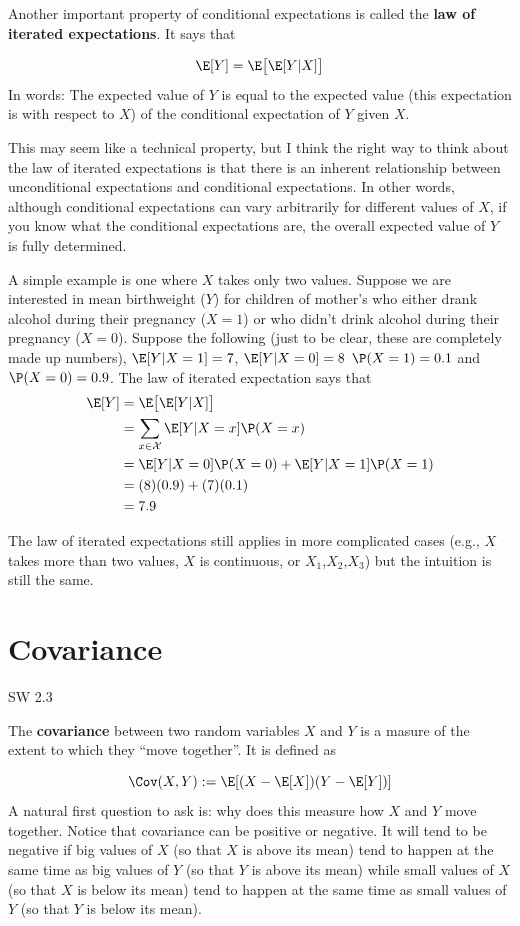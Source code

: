 \documentclass[
  letterpaper,
  DIV=11,
  numbers=noendperiod]{scrreprt}
\begin{document}
Another important property of conditional expectations is called the
\textbf{law of iterated expectations}. It says that

\[
  \E[Y] = \E\big[ \E[Y|X] \big]
\] In words: The expected value of \(Y\) is equal to the expected value
(this expectation is with respect to \(X\)) of the conditional
expectation of \(Y\) given \(X\).

This may seem like a technical property, but I think the right way to
think about the law of iterated expectations is that there is an
inherent relationship between unconditional expectations and conditional
expectations. In other words, although conditional expectations can vary
arbitrarily for different values of \(X\), if you know what the
conditional expectations are, the overall expected value of \(Y\) is
fully determined.

A simple example is one where \(X\) takes only two values. Suppose we
are interested in mean birthweight (\(Y\)) for children of mother's who
either drank alcohol during their pregnancy (\(X=1\)) or who didn't
drink alcohol during their pregnancy (\(X=0\)). Suppose the following
(just to be clear, these are completely made up numbers),
\(\E[Y|X=1] = 7\), \(\E[Y|X=0]=8\) \(\P(X=1) = 0.1\) and
\(\P(X=0)=0.9\). The law of iterated expectation says that \[
  \begin{aligned}
  \E[Y] &= \E\big[ \E[Y|X] \big] \\
  &= \sum_{x \in \mathcal{X}} \E[Y|X=x] \P(X=x) \\
  &= \E[Y|X=0]\P(X=0) + \E[Y|X=1]\P(X=1) \\
  &= (8)(0.9) + (7)(0.1) \\
  &= 7.9
  \end{aligned}
\]

The law of iterated expectations still applies in more complicated cases
(e.g., \(X\) takes more than two values, \(X\) is continuous, or
\(X_1\),\(X_2\),\(X_3\)) but the intuition is still the same.

\section{Covariance}\label{covariance}

SW 2.3

The \textbf{covariance} between two random variables \(X\) and \(Y\) is
a masure of the extent to which they ``move together''. It is defined as

\[
  \Cov(X,Y) := \E[(X-\E[X])(Y-\E[Y])]
\] A natural first question to ask is: why does this measure how \(X\)
and \(Y\) move together. Notice that covariance can be positive or
negative. It will tend to be negative if big values of \(X\) (so that
\(X\) is above its mean) tend to happen at the same time as big values
of \(Y\) (so that \(Y\) is above its mean) while small values of \(X\)
(so that \(X\) is below its mean) tend to happen at the same time as
small values of \(Y\) (so that \(Y\) is below its mean).
\end{document}
